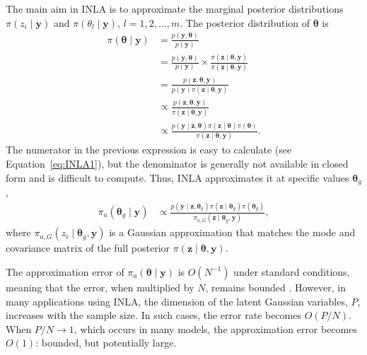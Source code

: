The main aim in INLA is to approximate the marginal posterior distributions $\pi(z_i\mid \boldsymbol{y})$ and $\pi(\theta_l\mid \boldsymbol{y})$, $l=1,2,\dots,m$.
The posterior distribution of $\boldsymbol{\theta}$ is
\begin{align*}	
	\pi(\boldsymbol{\theta}\mid \boldsymbol{y})&=\frac{p(\boldsymbol{y},\boldsymbol{\theta})}{p(\boldsymbol{y})}\\
	&=\frac{p(\boldsymbol{y},\boldsymbol{\theta})}{p(\boldsymbol{y})}\times \frac{\pi(\boldsymbol{z}\mid \boldsymbol{\theta},\boldsymbol{y})}{\pi(\boldsymbol{z}\mid\boldsymbol{\theta},\boldsymbol{y})}\\
	&=\frac{p(\boldsymbol{z},\boldsymbol{\theta},\boldsymbol{y})}{p(\boldsymbol{y})\pi(\boldsymbol{z}\mid \boldsymbol{\theta},\boldsymbol{y})}\\
	&\propto\frac{p(\boldsymbol{z},\boldsymbol{\theta},\boldsymbol{y})}{\pi(\boldsymbol{z}\mid \boldsymbol{\theta},\boldsymbol{y})}\\
	&\propto\frac{p(\boldsymbol{y}\mid \boldsymbol{z},\boldsymbol{\theta})\pi(\boldsymbol{z}\mid\boldsymbol{\theta})\pi(\boldsymbol{\theta})}{\pi(\boldsymbol{z}\mid \boldsymbol{\theta},\boldsymbol{y})}.
\end{align*}
The numerator in the previous expression is easy to calculate (see Equation~\ref{eq:INLA1}), but the denominator is generally not available in closed form and is difficult to compute. Thus, INLA approximates it at specific values $\boldsymbol{\theta}_g$,
\begin{align*}
	\pi_a(\boldsymbol{\theta}_g\mid \boldsymbol{y})&\propto\frac{p(\boldsymbol{y}\mid \boldsymbol{z},\boldsymbol{\theta}_g)\pi(\boldsymbol{z}\mid\boldsymbol{\theta}_g)\pi(\boldsymbol{\theta}_g)}{\pi_{a,G}(\boldsymbol{z}\mid \boldsymbol{\theta}_g,\boldsymbol{y})},
\end{align*} 
where $\pi_{a,G}(z_i \mid \boldsymbol{\theta}_g, \boldsymbol{y})$ is a Gaussian approximation that matches the mode and covariance matrix of the full posterior $\pi(\boldsymbol{z} \mid \boldsymbol{\theta}, \boldsymbol{y})$. 

The approximation error of $\pi_a(\boldsymbol{\theta} \mid \boldsymbol{y})$ is \( O(N^{-1}) \) under standard conditions, meaning that the error, when multiplied by \( N \), remains bounded \cite{Tierney1986, rue2009approximate}. However, in many applications using INLA, the dimension of the latent Gaussian variables, \( P \), increases with the sample size. In such cases, the error rate becomes \( O(P/N) \). When \( P/N \rightarrow 1 \), which occurs in many models, the approximation error becomes \( O(1) \): bounded, but potentially large.

